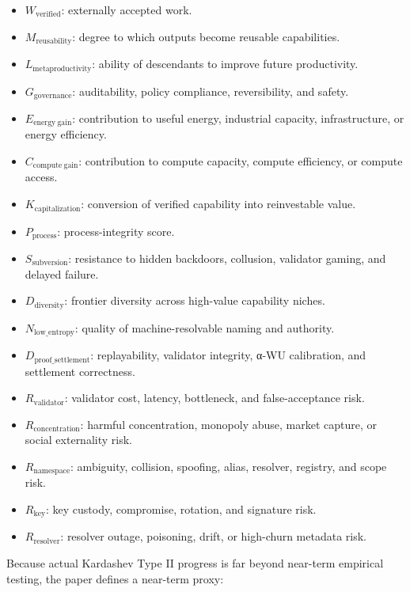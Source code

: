 \begin{itemize}
\tightlist
\item
  \(W_{\mathrm{verified}}\): externally accepted work.
\item
  \(M_{\mathrm{reusability}}\): degree to which outputs become reusable
  capabilities.
\item
  \(L_{\mathrm{metaproductivity}}\): ability of descendants to improve
  future productivity.
\item
  \(G_{\mathrm{governance}}\): auditability, policy compliance,
  reversibility, and safety.
\item
  \(E_{\mathrm{energy\ gain}}\): contribution to useful energy,
  industrial capacity, infrastructure, or energy efficiency.
\item
  \(C_{\mathrm{compute\ gain}}\): contribution to compute capacity,
  compute efficiency, or compute access.
\item
  \(K_{\mathrm{capitalization}}\): conversion of verified capability
  into reinvestable value.
\item
  \(P_{\mathrm{process}}\): process-integrity score.
\item
  \(S_{\mathrm{subversion}}\): resistance to hidden backdoors,
  collusion, validator gaming, and delayed failure.
\item
  \(D_{\mathrm{diversity}}\): frontier diversity across high-value
  capability niches.
\item
  \(N_{\mathrm{low\_entropy}}\): quality of machine-resolvable naming
  and authority.
\item
  \(D_{\mathrm{proof\_settlement}}\): replayability, validator
  integrity, α-WU calibration, and settlement correctness.
\item
  \(R_{\mathrm{validator}}\): validator cost, latency, bottleneck, and
  false-acceptance risk.
\item
  \(R_{\mathrm{concentration}}\): harmful concentration, monopoly abuse,
  market capture, or social externality risk.
\item
  \(R_{\mathrm{namespace}}\): ambiguity, collision, spoofing, alias,
  resolver, registry, and scope risk.
\item
  \(R_{\mathrm{key}}\): key custody, compromise, rotation, and signature
  risk.
\item
  \(R_{\mathrm{resolver}}\): resolver outage, poisoning, drift, or
  high-churn metadata risk.
\end{itemize}

Because actual Kardashev Type II progress is far beyond near-term
empirical testing, the paper defines a near-term proxy:

